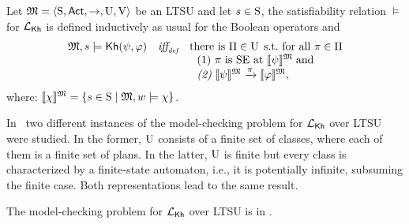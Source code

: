 \begin{definition} \label{def:semantics-kh-uncertain}
    Let $\model = \tup{\S,\Act,\ra,\Unc,\V}$ be an LTSU and let $s\in\S$, the satisfiability relation $\models$ for $\Khlogic$ is defined inductively as usual for the Boolean operators and
    \[
    \begin{array}{l@{\ \ \ }c@{\ \ \  }l}
    \model, s \models \kh(\psi,\varphi) & \iffdef & \text{there is } \plans \in \Unc \;\text{s.t.\ for all } \plan\in\plans \\
    & & \ \ \text{\rm (1)} \ \plan \text{ is SE at }  \truthset{\model}{\psi}\; \text{and} \\
    & & \ \ \text{\em (2)} \ \truthset{\model}{\psi} \reach{\plan} \truthset{\model}{\varphi}, 
    \end{array}
    \]      
    where: $\truthset{\model}{\chi} = \csetsc{s\in\S}{\model,w\models\chi}$. 
\end{definition}

In~\cite{AFSVQ21,DF23} two different instances of the model-checking problem for $\Khlogic$ over LTSU were studied. In the former, $\Unc$ consists of a finite set of classes, where each of them is a finite set of plans. In the latter, $\Unc$ is finite but every class is characterized by a finite-state automaton, i.e., it is potentially infinite, subsuming the finite case. Both representations lead to the same result.

\begin{proposition}{\cite{DF23}}
    The model-checking problem for $\Khlogic$ over LTSU is in \PTIME.
\end{proposition}

